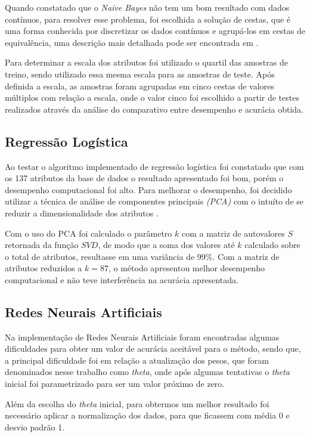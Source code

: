 \documentclass[10pt, conference, compsocconf]{IEEEtran}
\begin{document}
Quando constatado que o \textit{Naive Bayes} não tem um bom resultado com dados contínuos, para resolver esse problema, foi escolhida a solução de cestas, que é uma forma conhecida por discretizar os dados contínuos e agrupá-los em cestas de equivalência, uma descrição mais detalhada pode ser encontrada em \cite{8}. 

Para determinar a escala dos atributos foi utilizado o quartil das amostras de treino, sendo utilizado essa mesma escala para as amostras de teste. Após definida a escala, as amostras foram agrupadas em cinco cestas de valores múltiplos com relação a escala, onde o valor cinco foi escolhido a partir de testes realizados através da análise do comparativo entre desempenho e acurácia obtida.

\subsection{Regressão Logística}
Ao testar o algoritmo implementado de regressão logística foi constatado que com os 137 atributos da base de dados o resultado apresentado foi bom, porém o desempenho computacional foi alto. Para melhorar o desempenho, foi decidido utilizar a técnica de análise de componentes principais \textit{(PCA)} com o intuíto de se reduzir a dimensionalidade dos atributos \cite{9}. 

Com o uso do PCA foi calculado o parâmetro $k$ com a matriz de autovalores $S$ retornada da função $SVD$, de modo que a soma dos valores até $k$ calculado sobre o total de atributos, resultasse em uma variância de 99\%. Com a matriz de atributos reduzidos a $k=87$, o  método apresentou melhor desempenho computacional e não teve interferência na acurácia apresentada. 

\subsection{Redes Neurais Artificiais}
Na implementação de Redes Neurais Artificiais foram encontradas algumas dificuldades para obter um valor de acurácia aceitável para o método, sendo que, a principal dificuldade foi em relação a atualização dos pesos, que foram denominados nesse trabalho como \textit{theta}, onde após algumas tentativas o \textit{theta} inicial foi parametrizado para ser um valor próximo de zero. 

Além da escolha do \textit{theta} inicial, para obtermos um melhor resultado foi necessário aplicar a normalização dos dados, para que ficassem com média 0 e desvio padrão 1.
\end{document}
